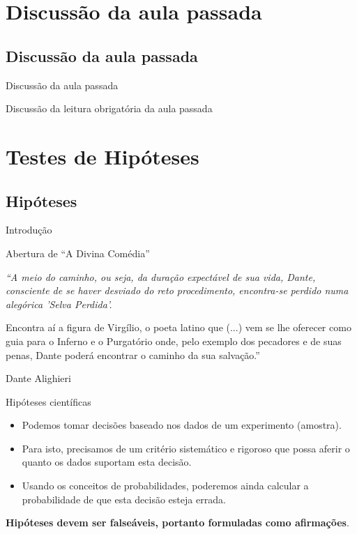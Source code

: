 \documentclass{beamer}
\begin{document}
\section{Discussão da aula passada}

\subsection{Discussão da aula passada}

\begin{frame}{Discussão da aula passada}
  \begin{block}{}
    Discussão da leitura obrigatória da aula passada
  \end{block}
\end{frame}

\section{Testes de Hipóteses}

\subsection{Hipóteses}

\begin{frame}{Introdução}
  \begin{block}{Abertura de ``A Divina Comédia''}
    \small
    {\em ``A meio do caminho, ou seja, da duração expectável de sua vida, Dante, consciente de se haver desviado do reto procedimento, encontra-se perdido numa alegórica 'Selva Perdida'.

      \bigskip
      Encontra aí a figura de Virgílio, o poeta latino que (...) vem se lhe oferecer como guia para o Inferno e o Purgatório onde, pelo exemplo dos pecadores e de suas penas, Dante poderá encontrar o caminho da sua salvação.''}
  \end{block}
\hfill Dante Alighieri
\end{frame}

\begin{frame}{Hipóteses científicas}
  \begin{itemize}
  \item Podemos tomar decisões baseado nos dados de um experimento
    (amostra).
  \item Para isto, precisamos de um critério sistemático e rigoroso
    que possa aferir o quanto os dados suportam esta decisão.
  \item Usando os conceitos de probabilidades, poderemos ainda
    calcular a probabilidade de que esta decisão esteja errada.
  \end{itemize}
  \begin{block}{}
    {\bf Hipóteses devem ser falseáveis, portanto formuladas como afirmações}.
  \end{block}
\end{frame}
\end{document}
